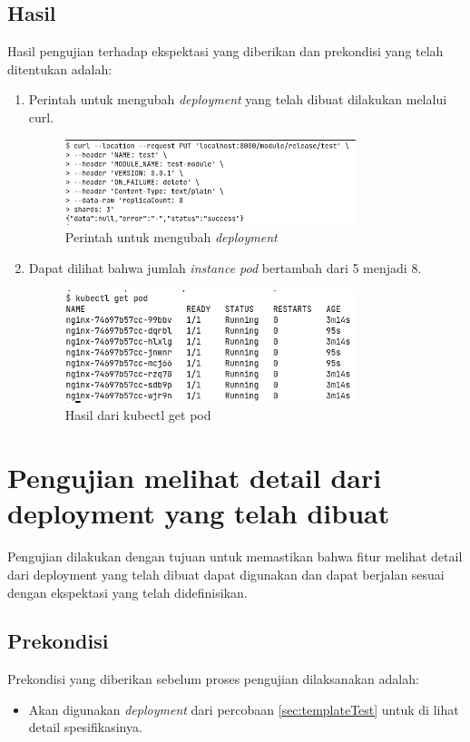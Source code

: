 \subsection{Hasil}
Hasil pengujian terhadap ekspektasi yang diberikan dan prekondisi yang telah ditentukan adalah:
\begin{enumerate}
    \item Perintah untuk mengubah \textit{deployment} yang telah dibuat dilakukan melalui curl.
    \begin{figure}
    	\centering
    	\includegraphics[width=0.8\textwidth]{pics/5.6.curl.png}
    	\caption{Perintah untuk mengubah \textit{deployment}}
    	\label{fig:putDeployment}
    \end{figure}
    \item Dapat dilihat bahwa jumlah \textit{instance pod} bertambah dari 5 menjadi 8.
    \begin{figure}
    	\centering
    	\includegraphics[width=0.8\textwidth]{pics/5.6.getPod.png}
    	\caption{Hasil dari kubectl get pod}
    	\label{fig:putKubectlGetPod}
    \end{figure}
\end{enumerate}


\section{Pengujian melihat detail dari deployment yang telah dibuat}
Pengujian dilakukan dengan tujuan untuk memastikan bahwa fitur melihat detail dari deployment yang telah dibuat dapat digunakan dan dapat berjalan sesuai dengan ekspektasi yang telah didefinisikan.
\subsection{Prekondisi}
Prekondisi yang diberikan sebelum proses pengujian dilaksanakan adalah:
\begin{itemize}
    \item Akan digunakan \textit{deployment} dari percobaan \ref{sec:templateTest} untuk di lihat detail spesifikasinya.
\end{itemize}
